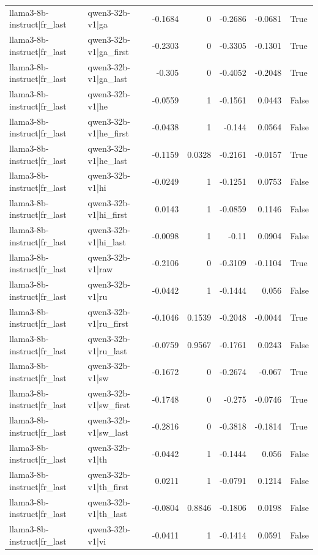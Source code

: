 \begin{table}
\begin{tabular}{l l r r r r l}
llama3-8b-instruct|fr_last & qwen3-32b-v1|ga & -0.1684 & 0 & -0.2686 & -0.0681 & True \\
llama3-8b-instruct|fr_last & qwen3-32b-v1|ga_first & -0.2303 & 0 & -0.3305 & -0.1301 & True \\
llama3-8b-instruct|fr_last & qwen3-32b-v1|ga_last & -0.305 & 0 & -0.4052 & -0.2048 & True \\
llama3-8b-instruct|fr_last & qwen3-32b-v1|he & -0.0559 & 1 & -0.1561 & 0.0443 & False \\
llama3-8b-instruct|fr_last & qwen3-32b-v1|he_first & -0.0438 & 1 & -0.144 & 0.0564 & False \\
llama3-8b-instruct|fr_last & qwen3-32b-v1|he_last & -0.1159 & 0.0328 & -0.2161 & -0.0157 & True \\
llama3-8b-instruct|fr_last & qwen3-32b-v1|hi & -0.0249 & 1 & -0.1251 & 0.0753 & False \\
llama3-8b-instruct|fr_last & qwen3-32b-v1|hi_first & 0.0143 & 1 & -0.0859 & 0.1146 & False \\
llama3-8b-instruct|fr_last & qwen3-32b-v1|hi_last & -0.0098 & 1 & -0.11 & 0.0904 & False \\
llama3-8b-instruct|fr_last & qwen3-32b-v1|raw & -0.2106 & 0 & -0.3109 & -0.1104 & True \\
llama3-8b-instruct|fr_last & qwen3-32b-v1|ru & -0.0442 & 1 & -0.1444 & 0.056 & False \\
llama3-8b-instruct|fr_last & qwen3-32b-v1|ru_first & -0.1046 & 0.1539 & -0.2048 & -0.0044 & True \\
llama3-8b-instruct|fr_last & qwen3-32b-v1|ru_last & -0.0759 & 0.9567 & -0.1761 & 0.0243 & False \\
llama3-8b-instruct|fr_last & qwen3-32b-v1|sw & -0.1672 & 0 & -0.2674 & -0.067 & True \\
llama3-8b-instruct|fr_last & qwen3-32b-v1|sw_first & -0.1748 & 0 & -0.275 & -0.0746 & True \\
llama3-8b-instruct|fr_last & qwen3-32b-v1|sw_last & -0.2816 & 0 & -0.3818 & -0.1814 & True \\
llama3-8b-instruct|fr_last & qwen3-32b-v1|th & -0.0442 & 1 & -0.1444 & 0.056 & False \\
llama3-8b-instruct|fr_last & qwen3-32b-v1|th_first & 0.0211 & 1 & -0.0791 & 0.1214 & False \\
llama3-8b-instruct|fr_last & qwen3-32b-v1|th_last & -0.0804 & 0.8846 & -0.1806 & 0.0198 & False \\
llama3-8b-instruct|fr_last & qwen3-32b-v1|vi & -0.0411 & 1 & -0.1414 & 0.0591 & False \\

\end{tabular}
\end{table}
